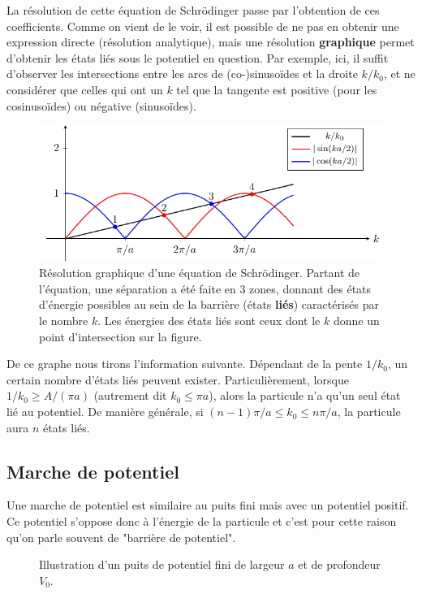 La résolution de cette équation de Schrödinger passe par l'obtention de ces coefficients. Comme on vient de le voir, il est possible de ne pas en obtenir une expression directe (résolution analytique), mais une résolution \textbf{graphique} permet d'obtenir les états liés sous le potentiel en question. Par exemple, ici, il suffit d'observer les intersections entre les arcs de (co-)sinusoïdes et la droite $k/k_0$, et ne considérer que celles qui ont un $k$ tel que la tangente est positive (pour les cosinusoïdes) ou négative (sinusoïdes). 

\begin{figure}[h]
  \centering
  \includegraphics{images/chap2-puits_fini_solutions.pdf}
  \caption{Résolution graphique d'une équation de Schrödinger. Partant de l'équation, une séparation a été faite en 3 zones, donnant des états d'énergie possibles au sein de la barrière (états \textbf{liés}) caractérisés par le nombre $k$. Les énergies des états liés sont ceux dont le $k$ donne un point d'intersection sur la figure.}
\end{figure}

De ce graphe nous tirons l'information suivante.
Dépendant de la pente $1/k_0$, un certain nombre d'états liés peuvent exister. Particulièrement, lorsque $1/k_0  \geq A/(\pi a)$ (autrement dit $k_0 \leq \pi a$), alors la particule n'a qu'un seul état lié au potentiel. De manière générale, si $(n-1)\pi/a \leq k_0 \leq n\pi/a$, la particule aura $n$ états liés.



\subsection{Marche de potentiel}
Une marche de potentiel est similaire au puits fini mais avec un potentiel positif. Ce potentiel s'oppose donc à l'énergie de la particule et c'est pour cette raison qu'on parle souvent de "barrière de potentiel".

\begin{figure}[h]
  \centering
  \scalebox{1.2}{}
  \caption{Illustration d'un puits de potentiel fini de largeur $a$ et de profondeur $V_0$.}
  \label{fig:chap2-marche_potentiel}
\end{figure}

